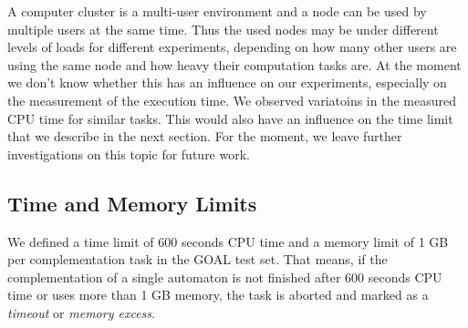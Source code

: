 A computer cluster is a multi-user environment and a node can be used by multiple users at the same time. Thus the used nodes may be under different levels of loads for different experiments, depending on how many other users are using the same node and how heavy their computation tasks are. At the moment we don't know whether this has an influence on our experiments, especially on the measurement of the execution time. We observed variatoins in the measured CPU time for similar tasks. This would also have an influence on the time limit that we describe in the next section. For the moment, we leave further investigations on this topic for future work.


\subsection{Time and Memory Limits}
\label{4_limits}
We defined a time limit of 600 seconds CPU time and a memory limit of 1 GB per complementation task in the GOAL test set. That means, if the complementation of a single automaton is not finished after 600 seconds CPU time or uses more than 1 GB memory, the task is aborted and marked as a \textit{timeout} or \textit{memory excess}.

